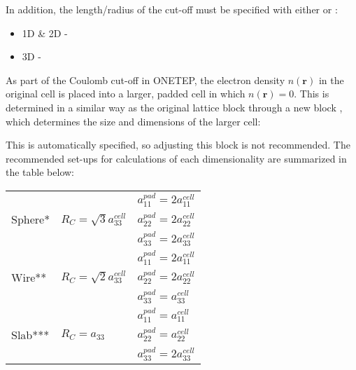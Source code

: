 \documentclass[letterpaper,10pt,english]{sphinxmanual}
\begin{document}
In addition, the length/radius of the cut-off must be specified with
either  or :
\begin{itemize}
\item {} 
1D \& 2D - 

\item {} 
3D - 

\end{itemize}

As part of the Coulomb cut-off in ONETEP, the electron density
\(n(\mathbf{r})\) in the original cell is placed into a larger,
padded cell in which \(n(\mathbf{r}) = 0\). This is determined in a
similar way as the original lattice block through a new block
, which determines the size and dimensions
of the larger cell:  
  

This is automatically specified, so adjusting this block is not
recommended. The recommended set-ups for calculations of each
dimensionality are summarized in the table below:


\begin{savenotes}\sphinxattablestart
\centering
\begin{tabulary}{\linewidth}[t]{|T|T|T|}
\hline
{}\relax &\relax &\relax \\
\hline&&
\(a_{11}^{pad} = 2a_{11}^{cell}\)
\\
\hline
Sphere*
&
\(R_C = \sqrt{3}a_{33}^{cell}\)
&
\(a_{22}^{pad} = 2a_{22}^{cell}\)
\\
\hline&&
\(a_{33}^{pad} = 2a_{33}^{cell}\)
\\
\hline&&
\(a_{11}^{pad} = 2a_{11}^{cell}\)
\\
\hline
Wire**
&
\(R_C = \sqrt{2}a_{33}^{cell}\)
&
\(a_{22}^{pad} = 2a_{22}^{cell}\)
\\
\hline&&
\(a_{33}^{pad} = a_{33}^{cell}\)
\\
\hline&&
\(a_{11}^{pad} = a_{11}^{cell}\)
\\
\hline
Slab***
&
\(R_C = a_{33}\)
&
\(a_{22}^{pad} = a_{22}^{cell}\)
\\
\hline&&
\(a_{33}^{pad} = 2 a_{33}^{cell}\)
\\
\hline
\end{tabulary}
\par
\sphinxattableend\end{savenotes}
\end{document}
